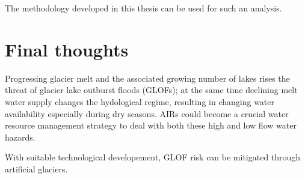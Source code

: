 The methodology developed in this thesis can be used for such an analysis.

\section{Final thoughts}

Progressing glacier melt and the associated growing number of lakes rises the threat of glacier lake outburst
floods (GLOFs); at the same time declining melt water supply changes the hydological regime, resulting in
changing water availability especially during dry seasons. AIRs could become a crucial water resource management
strategy to deal with both these high and low flow water hazards.

With suitable technological developement, GLOF risk can be mitigated through artificial glaciers.






